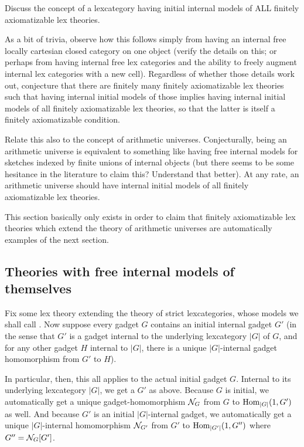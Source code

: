 \begin{TODOblock}
Discuss the concept of a lexcategory having initial internal models of ALL finitely axiomatizable lex theories.

As a bit of trivia, observe how this follows simply from having an internal free locally cartesian closed category on one object (verify the details on this; or perhaps from having internal free lex categories and the ability to freely augment internal lex categories with a new cell). Regardless of whether those details work out, conjecture that there are finitely many finitely axiomatizable lex theories such that having internal initial models of those implies having internal initial models of all finitely axiomatizable lex theories, so that the latter is itself a finitely axiomatizable condition.

Relate this also to the concept of arithmetic universes. Conjecturally, being an arithmetic universe is equivalent to something like having free internal models for sketches indexed by finite unions of internal objects (but there seems to be some hesitance in the literature to claim this? Understand that better). At any rate, an arithmetic universe should have internal initial models of all finitely axiomatizable lex theories.

This section basically only exists in order to claim that finitely axiomatizable lex theories which extend the theory of arithmetic universes are automatically examples of the next section.
\end{TODOblock}

\subsection{Theories with free internal models of themselves}
Fix some lex theory extending the theory of strict lexcategories, whose models we shall call . Now suppose every gadget $G$ contains an initial internal gadget $G'$ (in the sense that $G'$ is a gadget internal to the underlying lexcategory $|G|$ of $G$, and for any other gadget $H$ internal to $|G|$, there is a unique $|G|$-internal gadget homomorphism from $G'$ to $H$).

In particular, then, this all applies to the actual initial gadget $G$. Internal to its underlying lexcategory $|G|$, we get a $G'$ as above. Because $G$ is initial, we automatically get a unique gadget-homomorphism $\mathcal{N}_{G}$ from $G$ to $\operatorname{Hom}_{|G|}(1, G')$ as well. And because $G'$ is an initial $|G|$-internal gadget, we automatically get a unique $|G|$-internal homomorphism $\mathcal{N}_{G'}$ from $G'$ to $\operatorname{Hom}_{|G'|}(1, G'')$ where $G'' = \mathcal{N}_{G}[G']$.

